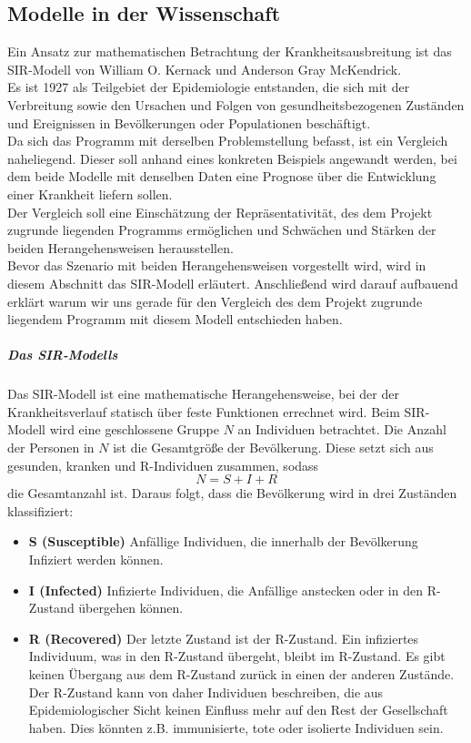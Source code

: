 \subsection*{Modelle in der Wissenschaft}
Ein Ansatz zur mathematischen Betrachtung der Krankheitsausbreitung ist das SIR-Modell von William O. Kernack und Anderson Gray McKendrick.\\
Es ist 1927 als Teilgebiet der Epidemiologie entstanden, die sich mit der Verbreitung sowie den Ursachen und Folgen von gesundheitsbezogenen Zuständen und Ereignissen in Bevölkerungen oder Populationen beschäftigt.\\
Da sich das Programm mit derselben Problemstellung befasst, ist ein Vergleich naheliegend.
Dieser soll anhand eines konkreten Beispiels angewandt werden, bei dem beide Modelle mit denselben Daten eine Prognose über die Entwicklung einer Krankheit liefern sollen.\\
Der Vergleich soll eine Einschätzung der Repräsentativität, des dem Projekt zugrunde liegenden Programms ermöglichen und Schwächen und Stärken der beiden Herangehensweisen herausstellen.\\
Bevor das Szenario mit beiden Herangehensweisen vorgestellt wird, wird in diesem Abschnitt das SIR-Modell erläutert. Anschließend wird darauf aufbauend erklärt warum wir uns gerade für den Vergleich des dem Projekt zugrunde liegendem Programm mit diesem Modell entschieden haben.

\subparagraph{Das SIR-Modells}
Das SIR-Modell ist eine mathematische Herangehensweise, bei der der Krankheitsverlauf statisch über feste Funktionen errechnet wird.
Beim SIR-Modell wird eine geschlossene Gruppe $ N $ an Individuen betrachtet. Die Anzahl der Personen in $ N $ ist die Gesamtgröße der Bevölkerung.
Diese setzt sich aus gesunden, kranken und \glqq R\grqq-Individuen zusammen, sodass 
\begin{equation}
 N = S + I + R 
\end{equation}
die Gesamtanzahl ist. Daraus folgt, dass die Bevölkerung wird in drei Zuständen klassifiziert:
\begin{itemize}
\item \textbf{S (Susceptible)} Anfällige Individuen, die innerhalb der Bevölkerung Infiziert werden können.
\item \textbf{I (Infected)} Infizierte Individuen, die Anfällige anstecken  oder in den R-Zustand übergehen können.
\item \textbf{R (Recovered)} Der letzte Zustand ist der R-Zustand. Ein infiziertes Individuum, was in den R-Zustand übergeht, bleibt im R-Zustand. Es gibt keinen Übergang aus dem R-Zustand zurück in einen der anderen Zustände. Der R-Zustand kann von daher Individuen beschreiben, die aus Epidemiologischer Sicht keinen Einfluss mehr auf den Rest der Gesellschaft haben. Dies könnten z.B. immunisierte, tote oder isolierte Individuen sein.
\end{itemize}

